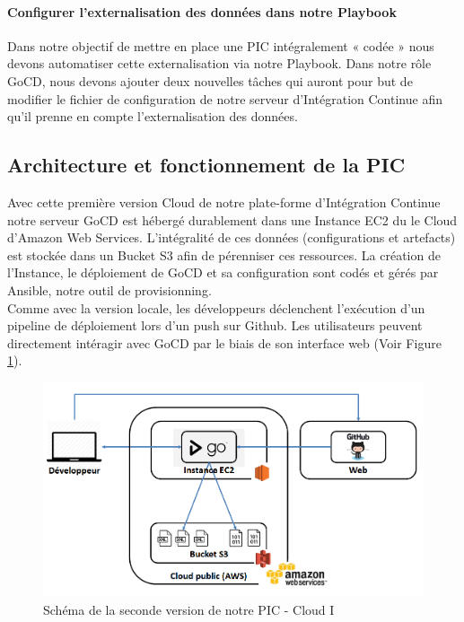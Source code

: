           \paragraph{Configurer l'externalisation des données dans notre Playbook} Dans notre objectif de mettre en place une PIC intégralement « codée » nous devons automatiser cette externalisation via notre Playbook. Dans notre rôle GoCD, nous devons ajouter deux nouvelles tâches qui auront pour but de modifier le fichier de configuration de notre serveur d'Intégration Continue afin qu'il prenne en compte l'externalisation des données.

        \subsection{Architecture et fonctionnement de la PIC}
        Avec cette première version Cloud de notre plate-forme d'Intégration Continue notre serveur GoCD est hébergé durablement dans une Instance EC2 du le Cloud d'Amazon Web Services. L'intégralité de ces données (configurations et artefacts) est stockée dans un Bucket S3 afin de pérenniser ces ressources. La création de l'Instance, le déploiement de GoCD et sa configuration sont codés et gérés par Ansible, notre outil de provisionning.\\

        Comme avec la version locale, les développeurs déclenchent l'exécution d'un pipeline de déploiement lors d'un push sur Github. Les utilisateurs peuvent directement intéragir avec GoCD par le biais de son interface web (Voir Figure \ref{PICv2}).\\

        \begin{figure}
          \begin{center}
            \includegraphics[scale=0.5]{images/PICv2.png}
          \end{center}
          \caption{Schéma de la seconde version de notre PIC - Cloud I}
          \label{PICv2}
        \end{figure}

